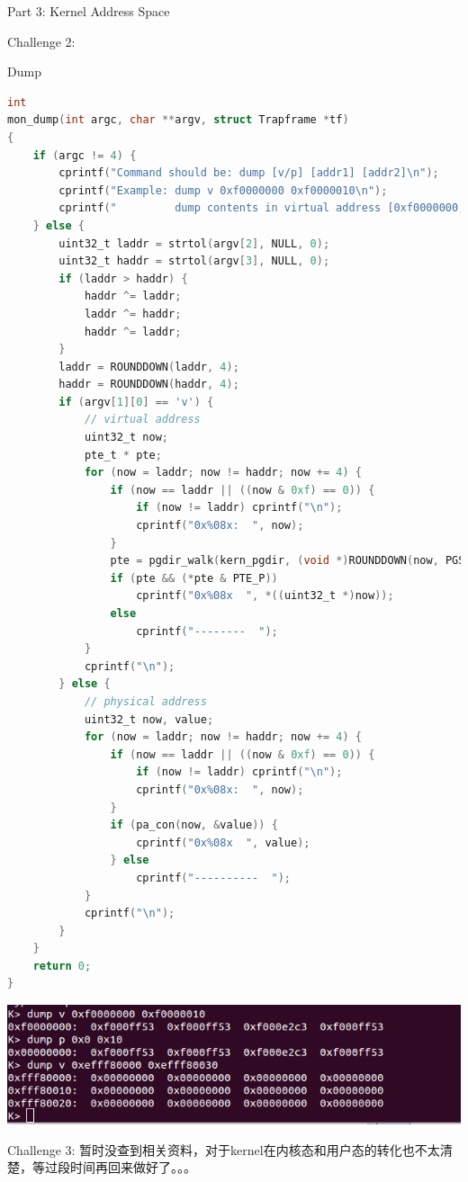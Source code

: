 \documentclass[GBK,winfonts,a4paper,10pt]{ctexart}
\begin{document}
\begin{section}{Part 3: Kernel Address Space}
\begin{subsection}{Challenge 2:}
\begin{subsubsection}{ Dump }
\begin{lstlisting}[language=C]
int
mon_dump(int argc, char **argv, struct Trapframe *tf)
{
    if (argc != 4) {
        cprintf("Command should be: dump [v/p] [addr1] [addr2]\n");
        cprintf("Example: dump v 0xf0000000 0xf0000010\n");
        cprintf("         dump contents in virtual address [0xf0000000, 0xf0000010)\n");
    } else {
        uint32_t laddr = strtol(argv[2], NULL, 0);
        uint32_t haddr = strtol(argv[3], NULL, 0);
        if (laddr > haddr) {
            haddr ^= laddr;
            laddr ^= haddr;
            haddr ^= laddr;
        }
        laddr = ROUNDDOWN(laddr, 4);
        haddr = ROUNDDOWN(haddr, 4);
        if (argv[1][0] == 'v') {
            // virtual address
            uint32_t now;
            pte_t * pte;
            for (now = laddr; now != haddr; now += 4) {
                if (now == laddr || ((now & 0xf) == 0)) {
                    if (now != laddr) cprintf("\n"); 
                    cprintf("0x%08x:  ", now);
                }
                pte = pgdir_walk(kern_pgdir, (void *)ROUNDDOWN(now, PGSIZE), 0);
                if (pte && (*pte & PTE_P)) 
                    cprintf("0x%08x  ", *((uint32_t *)now));
                else
                    cprintf("--------  ");
            }
            cprintf("\n");
        } else {
            // physical address
            uint32_t now, value;
            for (now = laddr; now != haddr; now += 4) {
                if (now == laddr || ((now & 0xf) == 0)) {
                    if (now != laddr) cprintf("\n");
                    cprintf("0x%08x:  ", now);
                }
                if (pa_con(now, &value)) {
                    cprintf("0x%08x  ", value);
                } else
                    cprintf("----------  ");
            }
            cprintf("\n");
        }
    }
    return 0;
}
\end{lstlisting}
\includegraphics[scale=0.5]{dump.png}
\end{subsubsection}
\end{subsection}

\begin{subsection}{Challenge 3:}
暂时没查到相关资料，对于kernel在内核态和用户态的转化也不太清楚，等过段时间再回来做好了。。。
\end{subsection}


\end{section}
\end{document}
